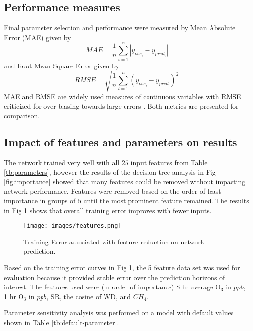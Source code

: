 \begin{linenumbers}
\subsection{Performance measures}

Final parameter selection and performance were measured by Mean Absolute Error (MAE) given by 
%
\begin{equation}
\label{eq:MAE}
MAE = \frac{1}{n}\sum^{n}_{i=1} \left | y_{obs_{i}}- y_{pred_{i}} \right |
\end{equation}
%
and Root Mean Square Error given by
%
\begin{equation}
\label{eq:RMSE}
RMSE = \sqrt{\frac{1}{n}\sum^{n}_{i=1} \left ( y_{obs_{i}}- y_{pred_{i}} \right )^{2}}
\end{equation}
%
MAE and RMSE are widely used measures of continuous variables with RMSE criticized for over-biasing towards large errors \citep{Chai2014, Willmott2005}. Both metrics are presented for comparison.

\subsection{Impact of features and parameters on results}

The network trained very well with all 25 input features from Table \ref{tb:parameters}, however the results of the decision tree analysis in Fig \ref{fig:importance} showed that many features could be removed without impacting network performance. Features were removed based on the order of least importance in groups of 5 until the most prominent feature remained. The results in Fig \ref{fig:features} shows that overall training error improves with fewer inputs.
%
\begin{figure}
\centering
\texttt{[image: images/features.png]}  %
\caption{Training Error associated with feature reduction on network prediction.}
\label{fig:features}
\end{figure}
%
Based on the training error curves in Fig \ref{fig:features}, the 5 feature data set was used for evaluation because it provided stable error over the prediction horizons of interest. The features used were (in order of importance) 8 hr average O$_{3}$ in $ppb$, 1 hr O$_{3}$ in $ppb$, SR, the cosine of WD, and $CH_{4}$.

Parameter sensitivity analysis was performed on a model with default values shown in Table \ref{tb:default-parameter}.
%
\end{linenumbers}
